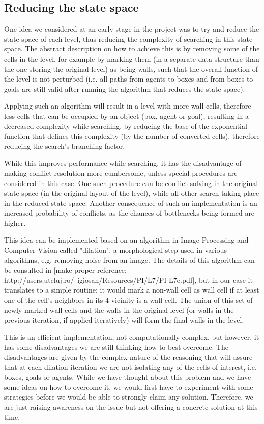 \documentclass[letterpaper]{article}
\begin{document}
\subsection{Reducing the state space}
One idea we considered at an early stage in the project was to try and reduce the state-space of each level, thus reducing the complexity of searching in this state-space. The abstract description on how to achieve this is by removing some of the cells in the level, for example by marking them (in a separate data structure than the one storing the original level) as being walls, such that the overall function of the level is not perturbed (i.e. all paths from agents to boxes and from boxes to goals are still valid after running the algorithm that reduces the state-space).

Applying such an algorithm will result in a level with more wall cells, therefore less cells that can be occupied by an object (box, agent or goal), resulting in a decreased complexity while searching, by reducing the base of the exponential function that defines this complexity (by the number of converted cells), therefore reducing the search's branching factor.

While this improves performance while searching, it has the disadvantage of making conflict resolution more cumbersome, unless special procedures are considered in this case. One such procedure can be conflict solving in the original state-space (in the original layout of the level), while all other search taking place in the reduced state-space. Another consequence of such an implementation is an increased probability of conflicts, as the chances of bottlenecks being formed are higher.

This idea can be implemented based on an algorithm in Image Processing and Computer Vision called "dilation", a morphological step used in various algorithms, e.g. removing noise from an image. The details of this algorithm can be consulted in [make proper reference: http://users.utcluj.ro/~igiosan/Resources/PI/L7/PI-L7e.pdf], but in our case it translates to a simple routine: it would mark a non-wall cell as wall cell if at least one of the cell's neighbors in its 4-vicinity is a wall cell. The union of this set of newly marked wall cells and the walls in the original level (or walls in the previous iteration, if applied iteratively) will form the final walls in the level.

This is an efficient implementation, not computationally complex, but however, it has some disadvantages we are still thinking how to best overcome. The disadvantages are given by the complex nature of the reasoning that will assure that at each dilation iteration we are not isolating any of the cells of interest, i.e. boxes, goals or agents. While we have thought about this problem and we have some ideas on how to overcome it, we would first have to experiment with some strategies before we would be able to strongly claim any solution. Therefore, we are just raising awareness on the issue but not offering a concrete solution at this time.
\end{document}
